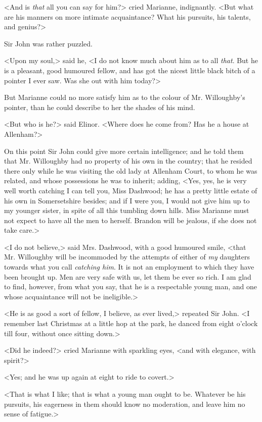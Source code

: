 <And is \textit{that} all you can say for him?> cried Marianne, indignantly. <But what are his manners on more intimate acquaintance? What his pursuits, his talents, and genius?>

Sir John was rather puzzled.

<Upon my soul,> said he, <I do not know much about him as to all \textit{that}. But he is a pleasant, good humoured fellow, and has got the nicest little black bitch of a pointer I ever saw. Was she out with him today?>

But Marianne could no more satisfy him as to the colour of Mr. Willoughby's pointer, than he could describe to her the shades of his mind.

<But who is he?> said Elinor. <Where does he come from? Has he a house at Allenham?>

On this point Sir John could give more certain intelligence; and he told them that Mr. Willoughby had no property of his own in the country; that he resided there only while he was visiting the old lady at Allenham Court, to whom he was related, and whose possessions he was to inherit; adding, <Yes, yes, he is very well worth catching I can tell you, Miss Dashwood; he has a pretty little estate of his own in Somersetshire besides; and if I were you, I would not give him up to my younger sister, in spite of all this tumbling down hills. Miss Marianne must not expect to have all the men to herself. Brandon will be jealous, if she does not take care.>

<I do not believe,> said Mrs. Dashwood, with a good humoured smile, <that Mr. Willoughby will be incommoded by the attempts of either of \textit{my} daughters towards what you call \textit{catching him}. It is not an employment to which they have been brought up. Men are very safe with us, let them be ever so rich. I am glad to find, however, from what you say, that he is a respectable young man, and one whose acquaintance will not be ineligible.>

<He is as good a sort of fellow, I believe, as ever lived,> repeated Sir John. <I remember last Christmas at a little hop at the park, he danced from eight o'clock till four, without once sitting down.>

<Did he indeed?> cried Marianne with sparkling eyes, <and with elegance, with spirit?>

<Yes; and he was up again at eight to ride to covert.>

<That is what I like; that is what a young man ought to be. Whatever be his pursuits, his eagerness in them should know no moderation, and leave him no sense of fatigue.>

